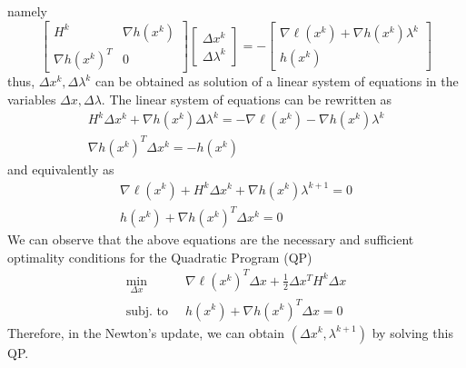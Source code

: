 \documentclass[openany]{book}
\theoremstyle{definition}
\theoremstyle{remark}
\begin{document}
namely 
\[
    \begin{bmatrix}
        H^k & \nabla h(x^k) \\
        \nabla h(x^k)^T & 0
        \end{bmatrix}  \begin{bmatrix}
        \Delta x^k \\ \Delta \lambda^k
        \end{bmatrix} = -\begin{bmatrix}
        \nabla \ell(x^k)+\nabla h(x^k)\lambda^k \\ h(x^k)
    \end{bmatrix}
\]
thus, $\Delta x^k, \Delta\lambda^k$ can be obtained as solution of a linear system of equations in the variables $\Delta x, \Delta\lambda$.
The linear system of equations can be rewritten as 
\begin{gather*}
    H^k\Delta x^k+\nabla h(x^k)\Delta \lambda^k = -\nabla\ell(x^k) - \nabla h(x^k)\lambda^k \\
    \nabla h(x^k)^T \Delta x^k = -h(x^k)
\end{gather*}
and equivalently as 
\begin{gather*}
    \nabla\ell(x^k) +H^k\Delta x^k+\nabla h(x^k)\lambda^{k+1} = 0 \\
    h(x^k)+\nabla h(x^k)^T\Delta x^k = 0
\end{gather*}
We can observe that the above equations are the necessary and sufficient optimality conditions for the Quadratic Program (QP)
\begin{align*}
    \min_{\Delta x}\  &\nabla\ell(x^k)^T\Delta x + \displaystyle\frac{1}{2}\Delta x^TH^k\Delta x \\
    \text{subj. to }\  & h(x^k) + \nabla h(x^k)^T \Delta x = 0
\end{align*}
Therefore, in the Newton's update, we can obtain $(\Delta x^k, \lambda^{k+1})$ by solving this QP.
\end{document}
